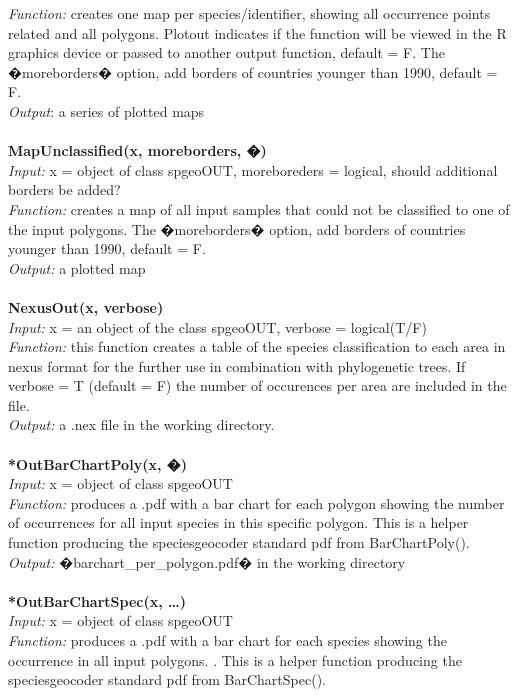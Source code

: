 \documentclass[a4paper,titlepage,11pt]{scrreprt}
\begin{document}
\textit{Function:} creates one map per species/identifier, showing all occurrence points related and all polygons. Plotout indicates if the function will be viewed in the R graphics device or passed to another output function, default = F. The �moreborders� option, add borders of countries younger than 1990, default = F.\\
\textit{Output}: a series of plotted maps\\
\\
\textbf{MapUnclassified(x, moreborders, �)}\\
\textit{Input:} x = object of class spgeoOUT, moreboreders = logical, should additional borders be added?\\
\textit{Function:} creates a map of all input samples that could not be classified to one of the input polygons. The �moreborders� option, add borders of countries younger than 1990, default = F.\\
\textit{Output:} a plotted map\\
\\
\textbf{NexusOut(x, verbose)}\\
\textit{Input:} x = an object of the class spgeoOUT, verbose = logical(T/F)\\
\textit{Function:} this function creates a table of the species classification to each area in nexus format for the further use in combination with phylogenetic trees. If verbose = T (default = F) the number of occurences per area are included in the file.\\
\textit{Output:} a .nex file in the working directory.\\
\\
\textbf{*OutBarChartPoly(x, �)}\\
\textit{Input:} x = object of class spgeoOUT\\
\textit{Function:} produces a .pdf with a bar chart for each polygon showing the  number of occurrences for all input species in this specific polygon. This is a helper function producing the speciesgeocoder standard pdf from BarChartPoly().\\
\textit{Output:} �barchart\_per\_polygon.pdf� in the working directory\\
\\
\textbf{*OutBarChartSpec(x, \dots)}\\
\textit{Input:} x = object of class spgeoOUT\\
\textit{Function:} produces a .pdf with a bar chart for each species showing the occurrence in all input polygons. . This is a helper function producing the speciesgeocoder standard pdf from BarChartSpec().\\
\end{document}
